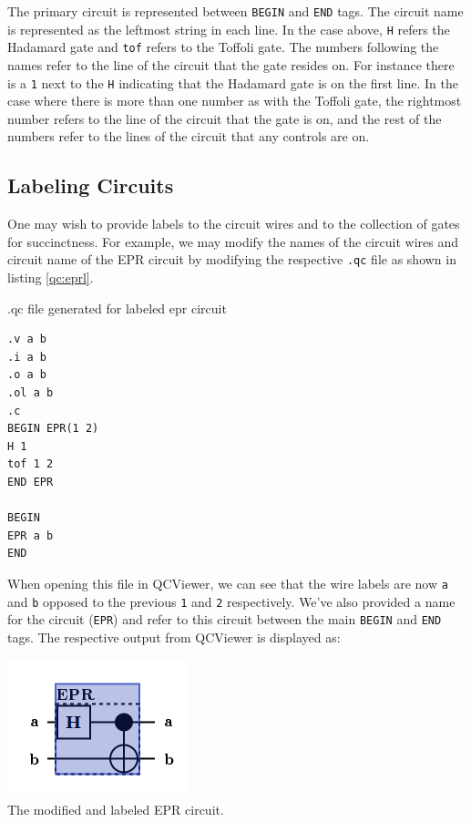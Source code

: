 \documentclass[10pt]{article}
\theoremstyle{definition}
\begin{document}
The primary circuit is represented between \verb+BEGIN+ and \verb+END+ tags. The circuit name is represented 
as the leftmost string in each line. In the case above, \verb+H+ refers the Hadamard gate and \verb+tof+ refers to the 
Toffoli gate. The numbers following the names refer to the line of the circuit that the gate resides on. 
For instance there is a \verb+1+ next to the \verb+H+ indicating that the Hadamard gate is on the first line. In the 
case where there is more than one number as with the Toffoli gate, the rightmost number refers to the line of 
the circuit that the gate is on, and the rest of the numbers refer to the lines of the circuit that any 
controls are on.

\subsection{Labeling Circuits}\label{sec:LabelingCircuits}

One may wish to provide labels to the circuit wires and to the collection of gates for succinctness. 
For example, we may modify the names of the circuit wires and circuit name of the EPR circuit by 
modifying the respective \verb+.qc+ file as shown in listing \ref{qc:eprl}.

\begin{program}
\caption{ .qc file generated for labeled epr circuit}
\label{qc:eprl}
\begin{verbatim}
.v a b
.i a b
.o a b
.ol a b
.c
BEGIN EPR(1 2)
H 1
tof 1 2
END EPR

BEGIN
EPR a b
END
\end{verbatim}
\end{program}

When opening this file in QCViewer, we can see that the wire labels are now \verb+a+ and \verb+b+ 
opposed to the previous \verb+1+ and \verb+2+ respectively. We've also provided a name for 
the circuit (\verb+EPR+) and refer to this circuit between the main \verb+BEGIN+ and \verb+END+ tags. 
The respective output from QCViewer is displayed as:

\begin{center}
\includegraphics[scale=.7]{Figures/QCFiles/EPRCircuitLabel} \\
The modified and labeled EPR circuit.
\end{center}
\end{document}
